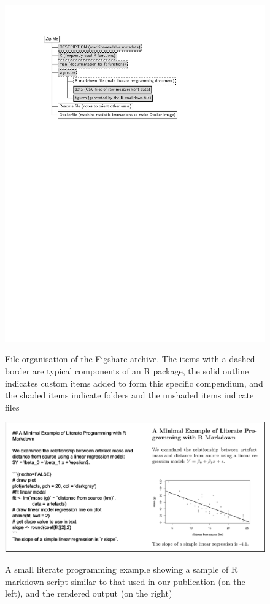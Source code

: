 \documentclass[american,man]{apa6}
\begin{document}
\begin{figure}[h!]
  \caption{File organisation of the Figshare archive. The items with a dashed border are typical components of an R package, the solid outline indicates custom items added to form this specific compendium, and the shaded items indicate folders and the unshaded items indicate files}
  \centering
\includegraphics[width=\textwidth]{../figures/figure_compendium_filesystem.pdf}
\label{fig:file_structure}
\end{figure}

\newpage

\begin{figure}[h!]
  \caption{A small literate programming example showing a sample of R markdown script similar to that used in our publication (on the left), and the rendered output (on the right)}
  \centering
\includegraphics[width=\textwidth]{../figures/figure_literate_programming_example_scource.png}
\label{fig:literate_programming}
\end{figure}
\end{document}
